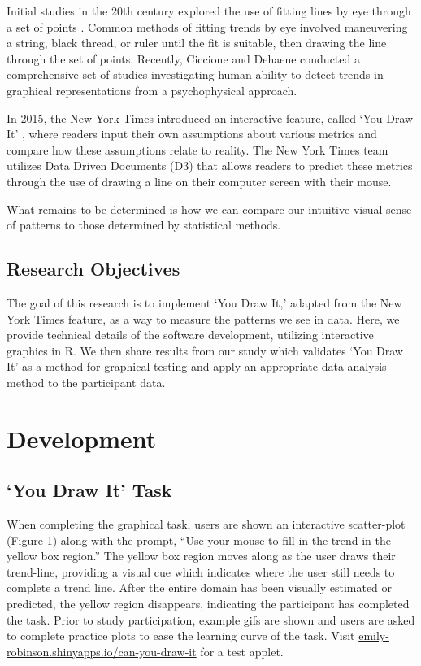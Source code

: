 \documentclass[10pt]{article}
\begin{document}
Initial studies in the 20th century explored the use of fitting lines by
eye through a set of points
\cite{finney1951subjective,mosteller1981eye}. Common methods of fitting
trends by eye involved maneuvering a string, black thread, or ruler
until the fit is suitable, then drawing the line through the set of
points. Recently, Ciccione and Dehaene 
conducted a comprehensive set of studies investigating human ability to
detect trends in graphical representations from a psychophysical
approach.

In 2015, the New York Times introduced an interactive feature, called
`You Draw It' \cite{aisch2015you}, where readers input their own
assumptions about various metrics and compare how these assumptions
relate to reality. The New York Times team utilizes Data Driven
Documents (D3) that allows readers to predict these metrics through the
use of drawing a line on their computer screen with their mouse.

What remains to be determined is how we can compare our intuitive visual
sense of patterns to those determined by statistical methods.

\subsection{Research Objectives}

The goal of this research is to implement `You Draw It,' adapted from
the New York Times feature, as a way to measure the patterns we see in
data. Here, we provide technical details of the software development,
utilizing interactive graphics in R. We then share results from our
study which validates `You Draw It' as a method for graphical testing
and apply an appropriate data analysis method to the participant data.

\section{Development}

\subsection{`You Draw It' Task}

When completing the graphical task, users are shown an interactive
scatter-plot (Figure 1) along with the prompt, ``Use your mouse to fill
in the trend in the yellow box region.'' The yellow box region moves
along as the user draws their trend-line, providing a visual cue which
indicates where the user still needs to complete a trend line. After the
entire domain has been visually estimated or predicted, the yellow
region disappears, indicating the participant has completed the task.
Prior to study participation, example gifs are shown and users are asked
to complete practice plots to ease the learning curve of the task. Visit
\url{emily-robinson.shinyapps.io/can-you-draw-it} for a test applet.
\end{document}
